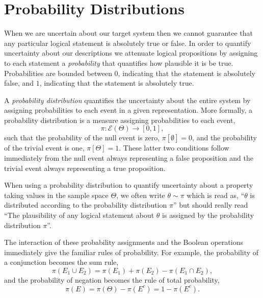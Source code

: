 \section{Probability Distributions}

When we are uncertain about our target system then we cannot
guarantee that any particular logical statement is absolutely
true or false.  In order to quantify uncertainty about our descriptions 
we attenuate logical propositions by assigning to each statement
a \emph{probability} that quantifies how plausible it is be true.  
Probabilities are bounded between $0$, indicating that the 
statement is absolutely false, and $1$, indicating that the statement 
is absolutely true.

A \emph{probability distribution} quantifies the uncertainty about
the entire system by assigning probabilities to each event in a
given representation.  More formally, a probability distribution is
a measure assigning probabilities to each event,
%
\begin{equation*}
\pi : \mathcal{E} \! \left( \Theta \right) \rightarrow \left[0, 1 \right],
\end{equation*}
%
such that the probability of the null event is zero, 
$\pi \! \left[ \emptyset \right] = 0$, and the probability of the trivial
event is one, $\pi \! \left[ \Theta \right] = 1$.  These latter two 
conditions follow immediately from the null event always representing
a false proposition and the trivial event always representing a
true proposition.

When using a probability distribution to quantify uncertainty about 
a property taking values in the sample space $\Theta$, we often 
write $\theta \sim \pi$ which is read as, ``$\theta$ is distributed 
according to the probability distribution $\pi$'' but should really 
read ``The plausibility of any logical statement about $\theta$ 
is assigned by the probability distribution $\pi$''.

The interaction of these probability assignments and the Boolean
operations immediately give the familiar rules of probability.  For 
example, the probability of a conjunction becomes the sum rule,
%
\begin{equation*}
\pi \! \left( E_{1} \cup E_{2} \right)
= 
\pi \! \left( E_{1} \right) + \pi \! \left( E_{2} \right)
- \pi \! \left( E_{1} \cap E_{2} \right),
\end{equation*}
%
and the probability of negation becomes the rule of total probability,
%
\begin{equation*}
\pi \! \left( E \right)
= 
\pi \! \left( \Theta \right) - \pi \! \left( E^{c} \right)
=
1 - \pi \! \left( E^{c} \right).
\end{equation*}

